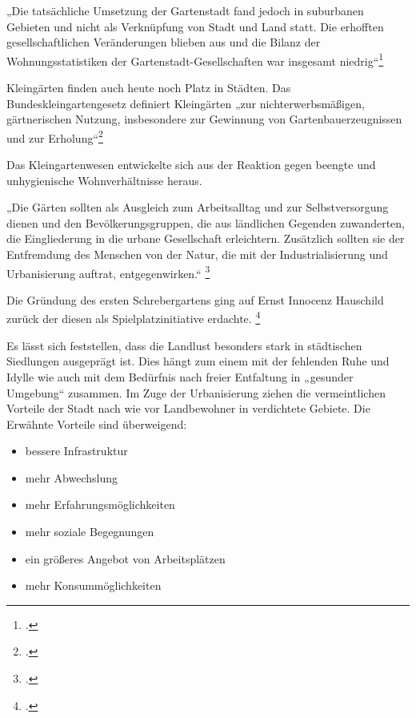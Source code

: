\documentclass{scrartcl}
\begin{document}
\begin{displayquote}
„Die tatsächliche Umsetzung der Gartenstadt fand jedoch in suburbanen Gebieten und nicht als Verknüpfung von Stadt und Land statt. Die erhofften gesellschaftlichen Veränderungen blieben aus und die Bilanz der Wohnungsstatistiken der Gartenstadt-Gesellschaften war insgesamt niedrig“\footcite[S. 36]{Egnolff2015DieIdeal} 
\end{displayquote}


Kleingärten finden auch heute noch Platz in Städten. Das Bundeskleingartengesetz definiert Kleingärten „zur nichterwerbsmäßigen, gärtnerischen Nutzung, insbesondere zur Gewinnung von Gartenbauerzeugnissen und zur Erholung“\footcite[§ 1]{Verbraucherschutz2006BundeskleingartengesetzBKleingG}

Das Kleingartenwesen entwickelte sich aus der Reaktion gegen beengte und unhygienische Wohnverhältnisse heraus. 

\begin{displayquote}
„Die Gärten sollten als Ausgleich zum Arbeitsalltag und zur Selbstversorgung dienen und den Bevölkerungsgruppen, die aus ländlichen Gegenden zuwanderten, die Eingliederung in die urbane Gesellschaft erleichtern. Zusätzlich sollten sie der Entfremdung des Menschen von der Natur, die mit der Industrialisierung
und Urbanisierung auftrat, entgegenwirken.“ \footcite[Vgl.][S. 38]{Egnolff2015DieIdeal}
\end{displayquote} 

Die Gründung des ersten Schrebergartens ging auf Ernst Innocenz Hauschild zurück der diesen als Spielplatzinitiative erdachte. \footcite[Vgl.][S. 39]{Egnolff2015DieIdeal}


Es lässt sich feststellen, dass die Landlust besonders stark in städtischen Siedlungen ausgeprägt ist. Dies hängt zum einem mit der fehlenden Ruhe und Idylle wie auch mit dem Bedürfnis nach freier Entfaltung in „gesunder Umgebung“ zusammen. Im Zuge der Urbanisierung ziehen die vermeintlichen Vorteile der Stadt nach wie vor Landbewohner in verdichtete Gebiete. Die Erwähnte Vorteile sind überweigend: 

\begin{itemize}
\item bessere Infrastruktur
\item mehr Abwechslung
\item mehr Erfahrungsmöglichkeiten 
\item mehr soziale Begegnungen
\item ein größeres Angebot von Arbeitsplätzen
\item mehr Konsummöglichkeiten
\end{itemize}
\end{document}
